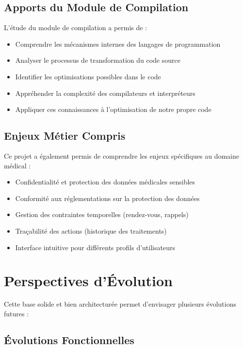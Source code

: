 \documentclass[12pt,a4paper]{report}
\begin{document}
\subsection{Apports du Module de Compilation}

L'étude du module de compilation a permis de :
\begin{itemize}
    \item Comprendre les mécanismes internes des langages de programmation
    \item Analyser le processus de transformation du code source
    \item Identifier les optimisations possibles dans le code
    \item Appréhender la complexité des compilateurs et interpréteurs
    \item Appliquer ces connaissances à l'optimisation de notre propre code
\end{itemize}

\subsection{Enjeux Métier Compris}

Ce projet a également permis de comprendre les enjeux spécifiques au domaine médical :
\begin{itemize}
    \item Confidentialité et protection des données médicales sensibles
    \item Conformité aux réglementations sur la protection des données
    \item Gestion des contraintes temporelles (rendez-vous, rappels)
    \item Traçabilité des actions (historique des traitements)
    \item Interface intuitive pour différents profils d'utilisateurs
\end{itemize}

\section{Perspectives d'Évolution}

Cette base solide et bien architecturée permet d'envisager plusieurs évolutions futures :

\subsection{Évolutions Fonctionnelles}
\end{document}

